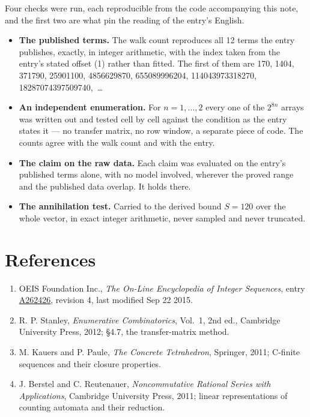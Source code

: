 \documentclass[11pt]{article}
\theoremstyle{definition}
\begin{document}
Four checks were run, each reproducible from the code accompanying this note, and the first two are what pin the reading of the entry's English.

\begin{itemize}

\item {\bfseries The published terms.} The walk count reproduces all 12 terms the entry publishes, exactly, in integer arithmetic, with the index taken from the entry's stated offset (1) rather than fitted. The first of them are 170, 1404, 371790, 25901100, 4856629870, 655089996204, 114043973318270, 18287074397509740,~\dots

\item {\bfseries An independent enumeration.} For $n = 1,\dots,2$ every one of the $2^{8n}$ arrays was written out and tested cell by cell against the condition as the entry states it --- no transfer matrix, no row window, a separate piece of code. The counts agree with the walk count and with the entry.

\item {\bfseries The claim on the raw data.} Each claim was evaluated on the entry's published terms alone, with no model involved, wherever the proved range and the published data overlap. It holds there.

\item {\bfseries The annihilation test.} Carried to the derived bound $S = 120$ over the whole vector, in exact integer arithmetic, never sampled and never truncated.

\end{itemize}

\section{References}

\begin{enumerate}

\item OEIS Foundation Inc., \emph{The On-Line Encyclopedia of Integer Sequences}, entry \href{https://oeis.org/A262426}{A262426}, revision 4, last modified Sep 22 2015.

\item R. P. Stanley, \emph{Enumerative Combinatorics}, Vol.~1, 2nd ed., Cambridge University Press, 2012; \S4.7, the transfer-matrix method.

\item M. Kauers and P. Paule, \emph{The Concrete Tetrahedron}, Springer, 2011; C-finite sequences and their closure properties.

\item J. Berstel and C. Reutenauer, \emph{Noncommutative Rational Series with Applications}, Cambridge University Press, 2011; linear representations of counting automata and their reduction.

\end{enumerate}
\end{document}
